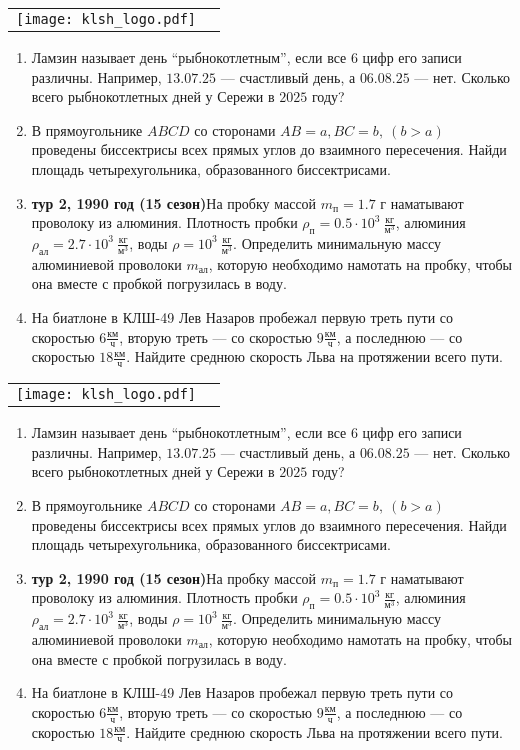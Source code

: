 \documentclass[11pt]{article} %
\newcommand{\shortname}{ФМТ. Тур 1.} %
\newcommand{\putlogo}{
\begin{center}
\begin{tabular}{cc}
\texttt{[image: klsh\_logo.pdf]} &
\raisebox{1cm}{
    {\Large\bf \shortname \hspace*{8cm} КЛШ $50$}
}
\end{tabular}
\end{center}
}
\newcommand{\easymath}{
    Ламзин называет день “рыбнокотлетным”, если все $6$ цифр его записи различны. Например, $13.07.25$ — счастливый день, а $06.08.25$ — нет. Сколько всего рыбнокотлетных дней у Сережи в $2025$ году?
}
\newcommand{\hardmath}{
    В прямоугольнике $ABCD$ со сторонами $AB = a, BC = b,\ (b > a)$ проведены биссектрисы всех прямых углов до взаимного пересечения. Найди площадь четырехугольника, образованного биссектрисами.
}
\newcommand{\easyphys}{
    \textbf{тур 2, 1990 год (15 сезон)}\quad На пробку массой $m_{\text{п}} = 1.7$ г наматывают проволоку из алюминия. Плотность пробки $\rho_{\text{п}} = 0.5 \cdot 10^3\ \frac{\text{кг}}{\text{м}^3}$, алюминия $\rho_{\text{ал}} = 2.7 \cdot 10^3\ \frac{\text{кг}}{\text{м}^3}$, воды $\rho = 10^3\ \frac{\text{кг}}{\text{м}^3}$. Определить минимальную массу алюминиевой проволоки $m_{\text{ал}}$, которую необходимо намотать на пробку, чтобы она вместе с пробкой погрузилась в воду.
}
\newcommand{\hardphys}{
    На биатлоне в КЛШ-49 Лев Назаров пробежал первую треть пути со скоростью $6 \frac{\text{км}}{\text{ч}}$, вторую треть — со скоростью $9 \frac{\text{км}}{\text{ч}}$, а последнюю — со скоростью $18 \frac{\text{км}}{\text{ч}}$. Найдите среднюю скорость Льва на протяжении всего пути.
}
\begin{document}
\newpage %
\putlogo

\begin{enumerate}
    \item \easymath
    \item \hardmath
    \item \easyphys
    \item \hardphys
\end{enumerate}

\vfill

\putlogo

\begin{enumerate}
    \item \easymath
    \item \hardmath
    \item \easyphys
    \item \hardphys
\end{enumerate}
\end{document}
